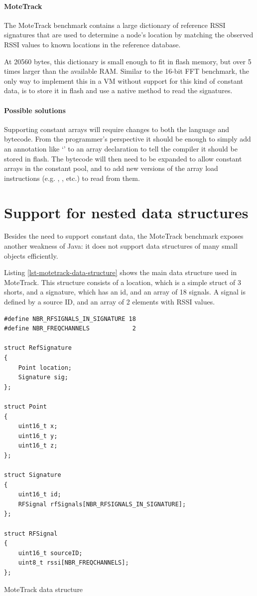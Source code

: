 \paragraph{MoteTrack}
The MoteTrack benchmark contains a large dictionary of reference RSSI signatures that are used to determine a node's location by matching the observed RSSI values to known locations in the reference database.

At 20560 bytes, this dictionary is small enough to fit in flash memory, but over 5 times larger than the available RAM. Similar to the 16-bit FFT benchmark, the only way to implement this in a VM without support for this kind of constant data, is to store it in flash and use a native method to read the signatures.

\paragraph{Possible solutions}
Supporting constant arrays will require changes to both the language and bytecode. From the programmer's perspective it should be enough to simply add an annotation like `' to an array declaration to tell the compiler it should be stored in flash. The bytecode will then need to be expanded to allow constant arrays in the constant pool, and to add new versions of the array load instructions (e.g. , , etc.) to read from them.




\section{Support for nested data structures}
\label{sec-nested-data}
Besides the need to support constant data, the MoteTrack benchmark exposes another weakness of Java: it does not support data structures of many small objects efficiently.

Listing \ref{lst-motetrack-data-structure} shows the main  data structure used in MoteTrack. This structure consists of a location, which is a simple struct of 3 shorts, and a signature, which has an id, and an array of 18 signals. A signal is defined by a source ID, and an array of 2 elements with RSSI values.

\begin{listing}[H]
\small
\centering
\begin{verbatim}
#define NBR_RFSIGNALS_IN_SIGNATURE 18
#define NBR_FREQCHANNELS            2

struct RefSignature
{
    Point location;
    Signature sig;
};

struct Point
{
    uint16_t x;
    uint16_t y;
    uint16_t z;
};

struct Signature
{
    uint16_t id;
    RFSignal rfSignals[NBR_RFSIGNALS_IN_SIGNATURE];
};

struct RFSignal
{
    uint16_t sourceID;
    uint8_t rssi[NBR_FREQCHANNELS];
};
\end{verbatim}
\caption{MoteTrack  data structure}
\label{lst-motetrack-data-structure}
\end{listing}


